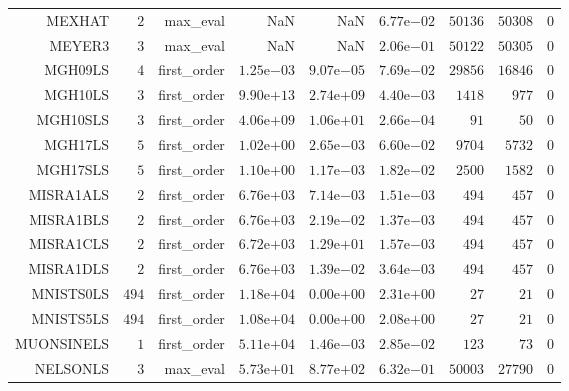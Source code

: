 \begin{longtable}{rrrrrrrrr}
MEXHAT & \(     2\) & max\_eval &       NaN &       NaN & \( 6.77\)e\(-02\) & \( 50136\) & \( 50308\) & \(     0\) \\
MEYER3 & \(     3\) & max\_eval &       NaN &       NaN & \( 2.06\)e\(-01\) & \( 50122\) & \( 50305\) & \(     0\) \\
MGH09LS & \(     4\) & first\_order & \( 1.25\)e\(-03\) & \( 9.07\)e\(-05\) & \( 7.69\)e\(-02\) & \( 29856\) & \( 16846\) & \(     0\) \\
MGH10LS & \(     3\) & first\_order & \( 9.90\)e\(+13\) & \( 2.74\)e\(+09\) & \( 4.40\)e\(-03\) & \(  1418\) & \(   977\) & \(     0\) \\
MGH10SLS & \(     3\) & first\_order & \( 4.06\)e\(+09\) & \( 1.06\)e\(+01\) & \( 2.66\)e\(-04\) & \(    91\) & \(    50\) & \(     0\) \\
MGH17LS & \(     5\) & first\_order & \( 1.02\)e\(+00\) & \( 2.65\)e\(-03\) & \( 6.60\)e\(-02\) & \(  9704\) & \(  5732\) & \(     0\) \\
MGH17SLS & \(     5\) & first\_order & \( 1.10\)e\(+00\) & \( 1.17\)e\(-03\) & \( 1.82\)e\(-02\) & \(  2500\) & \(  1582\) & \(     0\) \\
MISRA1ALS & \(     2\) & first\_order & \( 6.76\)e\(+03\) & \( 7.14\)e\(-03\) & \( 1.51\)e\(-03\) & \(   494\) & \(   457\) & \(     0\) \\
MISRA1BLS & \(     2\) & first\_order & \( 6.76\)e\(+03\) & \( 2.19\)e\(-02\) & \( 1.37\)e\(-03\) & \(   494\) & \(   457\) & \(     0\) \\
MISRA1CLS & \(     2\) & first\_order & \( 6.72\)e\(+03\) & \( 1.29\)e\(+01\) & \( 1.57\)e\(-03\) & \(   494\) & \(   457\) & \(     0\) \\
MISRA1DLS & \(     2\) & first\_order & \( 6.76\)e\(+03\) & \( 1.39\)e\(-02\) & \( 3.64\)e\(-03\) & \(   494\) & \(   457\) & \(     0\) \\
MNISTS0LS & \(   494\) & first\_order & \( 1.18\)e\(+04\) & \( 0.00\)e\(+00\) & \( 2.31\)e\(+00\) & \(    27\) & \(    21\) & \(     0\) \\
MNISTS5LS & \(   494\) & first\_order & \( 1.08\)e\(+04\) & \( 0.00\)e\(+00\) & \( 2.08\)e\(+00\) & \(    27\) & \(    21\) & \(     0\) \\
MUONSINELS & \(     1\) & first\_order & \( 5.11\)e\(+04\) & \( 1.46\)e\(-03\) & \( 2.85\)e\(-02\) & \(   123\) & \(    73\) & \(     0\) \\
NELSONLS & \(     3\) & max\_eval & \( 5.73\)e\(+01\) & \( 8.77\)e\(+02\) & \( 6.32\)e\(-01\) & \( 50003\) & \( 27790\) & \(     0\) \\

\end{longtable}

